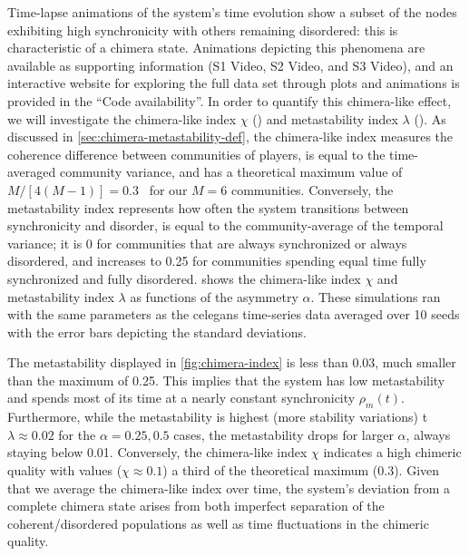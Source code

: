 \documentclass[10pt,letterpaper]{article}
\begin{document}
Time-lapse animations of the system's time evolution
show a subset of the nodes exhibiting high synchronicity
with others remaining disordered: this is characteristic of a chimera state.
Animations depicting this phenomena are available as supporting
information (S1 Video, S2 Video, and S3 Video),
and an interactive website for exploring the full data set
through plots and animations is provided in the ``Code availability''.
In order to quantify this chimera-like effect, we will investigate
the chimera-like index $\chi$ ()
and metastability index $\lambda$ ().
As discussed in \cref{sec:chimera-metastability-def},
the chimera-like index
measures the coherence difference between communities of players,
is equal to the time-averaged community variance,
and has a theoretical maximum value
of $M/[4(M-1)] = \num{0.3}$~\cite{shanahan2010metastable}
for our $M=6$ communities.
Conversely, the metastability index
represents how often the system transitions
between synchronicity and disorder,
is equal to the community-average of the temporal variance;
it is \num{0} for communities that are always synchronized
or always disordered,
and increases to \num{0.25} for communities spending
equal time fully synchronized and fully disordered.
 shows the
 chimera-like index $\chi$
and
 metastability index $\lambda$
as functions of the asymmetry $\alpha$.
These simulations ran with the same parameters as the
\gls{celegans} time-series data
averaged over 10 seeds
with the error bars depicting the standard deviations.

The metastability displayed in \cref{fig:chimera-index}
is less than \num{0.03}, much smaller
than the maximum of \num{0.25}.
This implies that the system has low metastability
and spends most of its time at a nearly constant
synchronicity $\rho_m(t)$.
Furthermore, while the metastability is highest (more stability variations)
t $\lambda \approx \num{0.02}$ for the $\alpha = 0.25, 0.5$ cases,
the metastability drops for larger $\alpha$,
always staying below \num{0.01}.
Conversely, the chimera-like index $\chi$
indicates a high chimeric quality
with values ($\chi \approx \num{0.1}$)
a third of the theoretical maximum (\num{0.3}).
Given that we average the chimera-like index over time,
the system's deviation from a complete chimera state
arises from both imperfect separation of the coherent/disordered populations
as well as time fluctuations in the chimeric quality.
\end{document}
